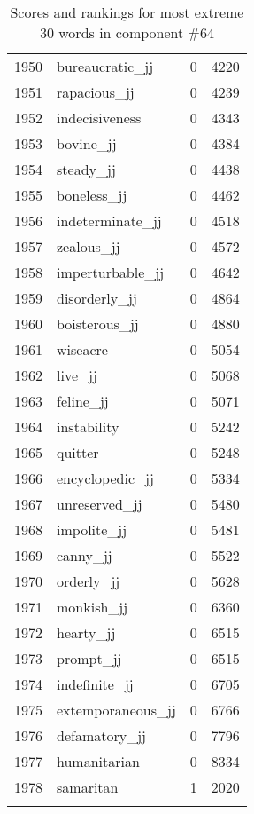 \begin{longtable}[!htbp]{| rlr@{.}l |}
    1950 & bureaucratic\_jj & 0 & 4220 \\
    1951 & rapacious\_jj & 0 & 4239 \\
    1952 & indecisiveness & 0 & 4343 \\
    1953 & bovine\_jj & 0 & 4384 \\
    1954 & steady\_jj & 0 & 4438 \\
    1955 & boneless\_jj & 0 & 4462 \\
    1956 & indeterminate\_jj & 0 & 4518 \\
    1957 & zealous\_jj & 0 & 4572 \\
    1958 & imperturbable\_jj & 0 & 4642 \\
    1959 & disorderly\_jj & 0 & 4864 \\
    1960 & boisterous\_jj & 0 & 4880 \\
    1961 & wiseacre & 0 & 5054 \\
    1962 & live\_jj & 0 & 5068 \\
    1963 & feline\_jj & 0 & 5071 \\
    1964 & instability & 0 & 5242 \\
    1965 & quitter & 0 & 5248 \\
    1966 & encyclopedic\_jj & 0 & 5334 \\
    1967 & unreserved\_jj & 0 & 5480 \\
    1968 & impolite\_jj & 0 & 5481 \\
    1969 & canny\_jj & 0 & 5522 \\
    1970 & orderly\_jj & 0 & 5628 \\
    1971 & monkish\_jj & 0 & 6360 \\
    1972 & hearty\_jj & 0 & 6515 \\
    1973 & prompt\_jj & 0 & 6515 \\
    1974 & indefinite\_jj & 0 & 6705 \\
    1975 & extemporaneous\_jj & 0 & 6766 \\
    1976 & defamatory\_jj & 0 & 7796 \\
    1977 & humanitarian & 0 & 8334 \\
    1978 & samaritan & 1 & 2020 \\
    \hline
    \caption{Scores and rankings for most extreme 30 words in component \#64} \\
\end{longtable}
